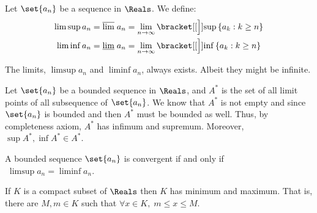


Let \(\set{a_n}\) be a sequence in \(\Reals\). We define:
\begin{align*}
    \limsup a_n &= \overline{\lim} \; a_n = \lim_{n \to \infty} \bracket[[\Big]]{\sup{\{a_k : k\geq n\}}}\\
    \liminf a_n &= \underline{\lim} \; a_n = \lim_{n \to \infty} \bracket[[\Big]]{\inf{\{a_k : k\geq n\}}}
\end{align*}

\begin{note}
    The limits, \(\limsup a_n \) and \(\liminf a_n\), always exists. Albeit they might be infinite.
\end{note}

Let \(\set{a_n}\) be a bounded sequence in \(\Reals\), and \(A^*\) is the set of all limit points of all subsequence of  \(\set{a_n}\). We know that \(A^*\) is not empty and since  \(\set{a_n}\) is bounded and then \(A^*\) must be bounded as well. Thus, by completeness axiom, \(A^*\) has infimum and supremum. Moreover, \(\sup A^*, \inf A^* \in A^*\).

\begin{proposition}
    A bounded sequence \(\set{a_n}\) is convergent if and only if \(\;\limsup a_n = \liminf a_n\).
\end{proposition}

\begin{corollary}
    If \(K\) is a compact subset of \(\Reals\) then \(K\) has minimum and maximum. That is, there are \(M,m \in K\) such that \(\forall x \in K,\; m \leq x \leq M\).
\end{corollary}


